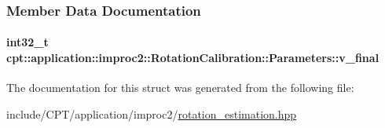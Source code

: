 \subsubsection{Member Data Documentation}
\hypertarget{structcpt_1_1application_1_1improc2_1_1_rotation_calibration_1_1_parameters_aa25d24d4244c1dd2739a69f5e38f4ffd}{
\paragraph[{v\-\_\-final}]{\setlength{\rightskip}{0pt plus 5cm}int32\-\_\-t cpt\-::application\-::improc2\-::\-Rotation\-Calibration\-::\-Parameters\-::v\-\_\-final}}\label{structcpt_1_1application_1_1improc2_1_1_rotation_calibration_1_1_parameters_aa25d24d4244c1dd2739a69f5e38f4ffd}


The documentation for this struct was generated from the following file\-:\begin{DoxyCompactItemize}
\item 
include/\-C\-P\-T/application/improc2/\hyperlink{application_2improc2_2rotation__estimation_8hpp}{rotation\-\_\-estimation.\-hpp}\end{DoxyCompactItemize}
